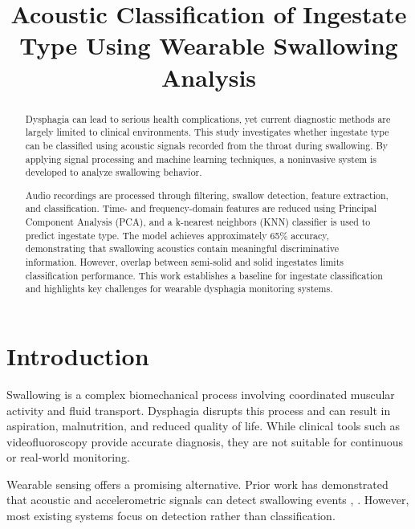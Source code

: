 \documentclass[conference]{IEEEtran}
\begin{document}
\title{Acoustic Classification of Ingestate Type Using Wearable Swallowing Analysis}

\author{
}

\maketitle

\begin{abstract}
Dysphagia can lead to serious health complications, yet current diagnostic methods are largely limited to clinical environments. This study investigates whether ingestate type can be classified using acoustic signals recorded from the throat during swallowing. By applying signal processing and machine learning techniques, a noninvasive system is developed to analyze swallowing behavior.

Audio recordings are processed through filtering, swallow detection, feature extraction, and classification. Time- and frequency-domain features are reduced using Principal Component Analysis (PCA), and a k-nearest neighbors (KNN) classifier is used to predict ingestate type. The model achieves approximately 65\% accuracy, demonstrating that swallowing acoustics contain meaningful discriminative information. However, overlap between semi-solid and solid ingestates limits classification performance. This work establishes a baseline for ingestate classification and highlights key challenges for wearable dysphagia monitoring systems.
\end{abstract}

\section{Introduction}

Swallowing is a complex biomechanical process involving coordinated muscular activity and fluid transport. Dysphagia disrupts this process and can result in aspiration, malnutrition, and reduced quality of life. While clinical tools such as videofluoroscopy provide accurate diagnosis, they are not suitable for continuous or real-world monitoring.

Wearable sensing offers a promising alternative. Prior work has demonstrated that acoustic and accelerometric signals can detect swallowing events \cite{1}, \cite{6}. However, most existing systems focus on detection rather than classification.
\end{document}
